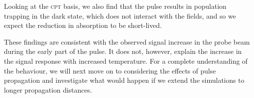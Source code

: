     Looking at the \textsc{cpt} basis, we also find that the pulse results in
    population trapping in the dark state, which does not interact with the
    fields, and so we expect the reduction in absorption to be short-lived.

    These findings are consistent with the observed signal increase in the probe
    beam during the early part of the pulse. It does not, however, explain the
    increase in the signal response with increased temperature. For a complete
    understanding of the behaviour, we will next move on to considering the
    effects of pulse propagation and investigate what would happen if we extend the simulations to longer propagation distances.

    


